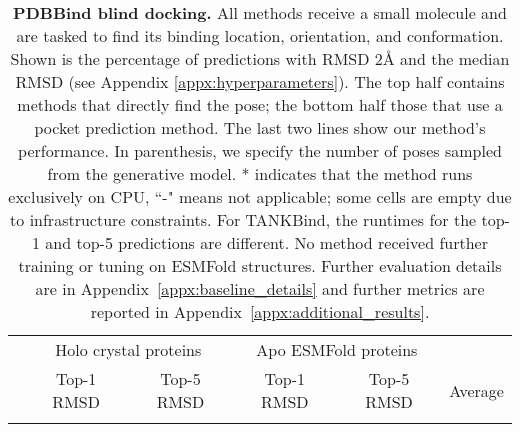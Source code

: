 \documentclass{article} \usepackage{iclr2023_conference,times}
\begin{document}
\begin{table}[t]
    \caption{\textbf{PDBBind blind docking.} All methods receive a small molecule and are tasked to find its binding location, orientation, and conformation. Shown is the percentage of predictions with RMSD  2\AA{} and the median RMSD (see Appendix \ref{appx:hyperparameters}). The top half contains methods that directly find the pose; the bottom half those that use a pocket prediction method. The last two lines show our method's performance. In parenthesis,     we specify the number of poses sampled from the generative model. * indicates that the method runs exclusively on CPU, ``-" means not applicable; some cells are empty due to infrastructure constraints. For TANKBind, the runtimes for the top-1 and top-5 predictions are different. No method received further training or tuning on ESMFold structures. Further evaluation details are in Appendix~\ref{appx:baseline_details} and further metrics are reported in Appendix~\ref{appx:additional_results}.}
    \label{tab:results_main}
     \begin{small}
     \begin{center}

    \begin{tabular}{lcc|cc|cc|cc|c}
    \toprule
      & \multicolumn{4}{c}{Holo crystal proteins} & \multicolumn{4}{c}{Apo ESMFold proteins} & \\ \rule{0pt}{2ex}
      
      & \multicolumn{2}{c}{Top-1 RMSD} & \multicolumn{2}{c}{Top-5 RMSD} & \multicolumn{2}{c}{Top-1 RMSD} & \multicolumn{2}{c}{Top-5 RMSD} & Average\\ \rule{0pt}{2ex}  
    

\end{tabular}
\end{center}
\end{small}
\end{table}
\end{document}
